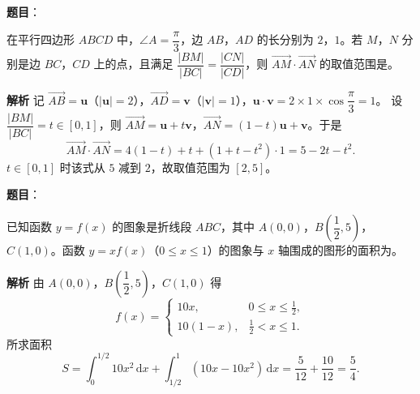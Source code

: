 \begin{answer}

\textbf{题目}：

在平行四边形 $ABCD$ 中，$\angle A=\dfrac\pi3$，边 $AB$，$AD$ 的长分别为 $2$，$1$。若 $M$，$N$ 分别是边 $BC$，$CD$ 上的点，且满足 $\dfrac{|BM|}{|BC|}=\dfrac{|CN|}{|CD|}$，则 $\overrightarrow{AM}\cdot\overrightarrow{AN}$ 的取值范围是\gkblank{}。

\textbf{解析}
记 $\overrightarrow{AB}=\boldsymbol u$（$|\boldsymbol u|=2$），$\overrightarrow{AD}=\boldsymbol v$（$|\boldsymbol v|=1$），$\boldsymbol u\cdot\boldsymbol v=2\times1\times\cos\dfrac\pi3=1$。
设 $\dfrac{|BM|}{|BC|}=t\in[0,1]$，则 $\overrightarrow{AM}=\boldsymbol u+t\boldsymbol v$，$\overrightarrow{AN}=(1-t)\boldsymbol u+\boldsymbol v$。于是
\nopagebreak[4]
\[\overrightarrow{AM}\cdot\overrightarrow{AN}=4(1-t)+t+(1+t-t^2)\cdot1=5-2t-t^2.\]
$t\in[0,1]$ 时该式从 $5$ 减到 $2$，故取值范围为 $[2,5]$。


\end{answer}
\begin{answer}

\textbf{题目}：

已知函数 $y=f(x)$ 的图象是折线段 $ABC$，其中 $A(0,0)$，$B\left(\dfrac12,5\right)$，$C(1,0)$。函数 $y=xf(x)$（$0\leqslant x\leqslant1$）的图象与 $x$ 轴围成的图形的面积为\gkblank{}。

\textbf{解析}
由 $A(0,0)$，$B\left(\dfrac12,5\right)$，$C(1,0)$ 得
\nopagebreak[4]
\[f(x)=\begin{cases}10x,&0\leqslant x\leqslant\frac12,\\ 10(1-x),&\frac12<x\leqslant1.\end{cases}\]
所求面积
\nopagebreak[4]
\[S=\int_0^{1/2}10x^2\,\mathrm dx+\int_{1/2}^1(10x-10x^2)\,\mathrm dx=\frac5{12}+\frac{10}{12}=\frac54.\]


\end{answer}
